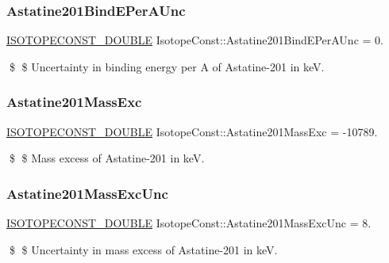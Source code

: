 \subsubsection{\texorpdfstring{Astatine201\+Bind\+E\+Per\+A\+Unc}{Astatine201BindEPerAUnc}}
{\footnotesize\ttfamily \mbox{\hyperlink{group___isotope_const-_macros_ga8f45a7272ce02c0b4c65c44636ed719a}{I\+S\+O\+T\+O\+P\+E\+C\+O\+N\+S\+T\+\_\+\+D\+O\+U\+B\+LE}} Isotope\+Const\+::\+Astatine201\+Bind\+E\+Per\+A\+Unc = 0.}

\$ \$ Uncertainty in binding energy per A of Astatine-\/201 in keV. \mbox{\label{group___isotope_const-_astatine-_at201_ga661d547280f00eadf64372a3741a7722}} 
\subsubsection{\texorpdfstring{Astatine201\+Mass\+Exc}{Astatine201MassExc}}
{\footnotesize\ttfamily \mbox{\hyperlink{group___isotope_const-_macros_ga8f45a7272ce02c0b4c65c44636ed719a}{I\+S\+O\+T\+O\+P\+E\+C\+O\+N\+S\+T\+\_\+\+D\+O\+U\+B\+LE}} Isotope\+Const\+::\+Astatine201\+Mass\+Exc = -\/10789.}

\$ \$ Mass excess of Astatine-\/201 in keV. \mbox{\label{group___isotope_const-_astatine-_at201_gad58f6401adbf2a9bf2667de8345d90df}} 
\subsubsection{\texorpdfstring{Astatine201\+Mass\+Exc\+Unc}{Astatine201MassExcUnc}}
{\footnotesize\ttfamily \mbox{\hyperlink{group___isotope_const-_macros_ga8f45a7272ce02c0b4c65c44636ed719a}{I\+S\+O\+T\+O\+P\+E\+C\+O\+N\+S\+T\+\_\+\+D\+O\+U\+B\+LE}} Isotope\+Const\+::\+Astatine201\+Mass\+Exc\+Unc = 8.}

\$ \$ Uncertainty in mass excess of Astatine-\/201 in keV. \mbox{\label{group___isotope_const-_astatine-_at201_ga7f64b5c86192bdee5e454d2584d689f9}} 
